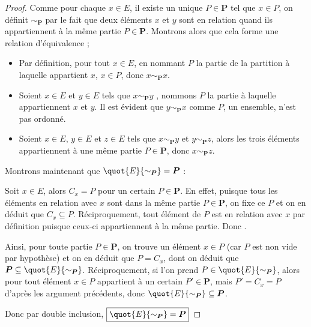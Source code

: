 \begin{proof}
    Comme pour chaque $x\in E$, il existe un unique $P\in\boldsymbol P$ tel que $x\in P$, on définit $\sim_{\boldsymbol P}$ par le fait que deux éléments $x$ et $y$ sont en relation quand ils appartiennent à la même partie $P\in\boldsymbol P$. Montrons alors que cela forme une relation d'équivalence ;
    \begin{itemize}[label=$\bullet$]
        \item Par définition, pour tout $x\in E$, en nommant $P$ la partie de la partition à laquelle appartient $x$, $x\in P$, donc \underline{$x\sim_{\boldsymbol P} x$}.
        \item Soient $x\in E$ et $y\in E$ tels que $x\sim_{\boldsymbol P} y$ , nommons $P$ la partie à laquelle appartiennent $x$ et $y$. Il est évident que \underline{$y\sim_{\boldsymbol P} x$} comme $P$, un ensemble, n'est pas ordonné.
        \item Soient $x\in E$, $y\in E$ et $z\in E$ tels que $x\sim_{\boldsymbol P} y$ et $y\sim_{\boldsymbol P} z$, alors les trois éléments appartiennent à une même partie $P\in\boldsymbol P$, donc \underline{$x\sim_{\boldsymbol P} z$}.
    \end{itemize}
    
    
    Montrons maintenant que $\quot{E}{\sim_{\boldsymbol P}}=\boldsymbol P$ :
    
    Soit $x\in E$, alors $C_x = P$ pour un certain $P\in\boldsymbol P$. En effet, puisque tous les éléments en relation avec $x$ sont dans la même partie $P\in\boldsymbol P$, on fixe ce $P$ et on en déduit que \underline{$C_x\subseteq P$}. Réciproquement, tout élément de $P$ est en relation avec $x$ par définition puisque ceux-ci appartiennent à la même partie. Donc . 
    
    Ainsi, pour toute partie $P\in\boldsymbol P$, on trouve un élément $x\in P$ (car $P$ est non vide par hypothèse) et on en déduit que $P=C_x$, dont on déduit que \underline{$\boldsymbol P \subseteq \quot{E}{\sim_{\boldsymbol P}}$}. Réciproquement, si l'on prend $P\in \quot{E}{\sim_{\boldsymbol P}}$, alors pour tout élément $x\in P$ appartient à un certain $P'\in\boldsymbol P$, mais $P'=C_x=P$ d'après les argument précédents, donc \underline{$\quot{E}{\sim_{\boldsymbol P}}\subseteq \boldsymbol P$}.
    
    Donc par double inclusion, $\boxed{\quot{E}{\sim_{\boldsymbol P}}= \boldsymbol P}$
    

\end{proof}
